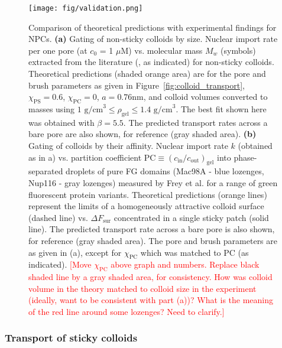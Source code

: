 \documentclass[12pt, a4paper]{article}
\newcommand\todo[1]{\textcolor{red}{#1}}
\begin{document}
\begin{figure}
    \centering
    \centerline{\texttt{[image: fig/validation.png]}}
    \caption{
    Comparison of theoretical predictions with experimental findings for NPCs.
    \textbf{(a)} 
    Gating of non-sticky colloids by size.
    Nuclear import rate per one pore (at $c_0$ = 1 $\mu\text{M}$) vs. molecular mass $M_w$ (symbols) extracted from the literature (\cite{Ribbeck2001, Mohr2009, Popken2015, Timney2016, Frey2018}, as indicated) for non-sticky colloids.
    Theoretical predictions (shaded orange area) are for the pore and brush parameters as given in Figure~\ref{fig:colloid_transport}, $\chi_{\text{PS}} = 0.6$, $\chi_{\text{PC}} = 0$, $a = 0.76 \text{nm}$, and colloid volumes converted to masses using $\text{1 g/cm}^3 \leq \rho_{\text{gel}} \leq \text{1.4 g/cm}^3$.
    The best fit shown here was obtained with $\beta = 5.5$.
    The predicted transport rates across a bare pore are also shown, for reference (gray shaded area).
    \textbf{(b)} 
    Gating of colloids by their affinity.
    Nuclear import rate $k$ (obtained as in a) vs. partition coefficient $\text{PC} \equiv \left(c_{\text{in}}/c_{\text{out}}\right)_{\text{gel}}$ into phase-separated droplets of pure FG domains (Mac98A - blue lozenges, Nup116 - gray lozenges) measured by Frey et al. \cite{Frey2018} for a range of green fluorescent protein variants.
    Theoretical predictions (orange lines) represent the limits of a homogeneously attractive colloid surface (dashed line) vs. $\Delta F_\text{sur}$ concentrated in a single sticky patch (solid line).
    The predicted transport rate across a bare pore is also shown, for reference (gray shaded area).
    The pore and brush parameters are as given in (a), except for $\chi_\text{PC}$ which was matched to $\text{PC}$ (as indicated).
    \todo{[Move $\chi_{\text{PC}}$ above graph and numbers. Replace black shaded line by a gray shaded area, for consistency.
    How was colloid volume in the theory matched to colloid size in the experiment (ideally, want to be consistent with part (a))? What is the meaning of the red line around some lozenges? Need to clarify.]}
    }
    \label{fig:NPC_comparison}
\end{figure}


\subsubsection{Transport of sticky colloids}
\end{document}
